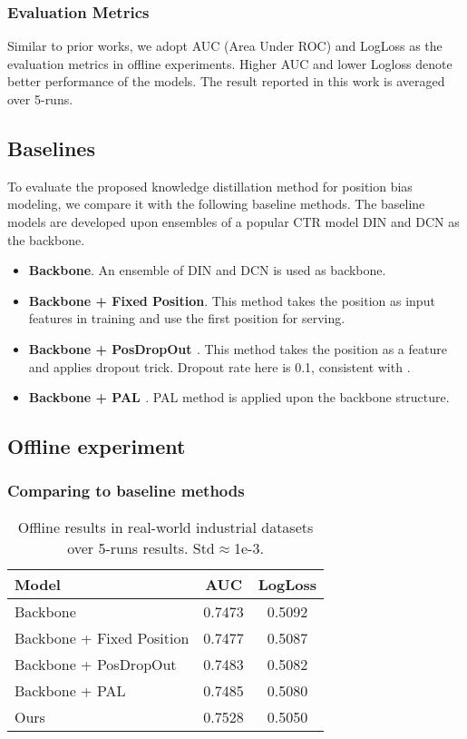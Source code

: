 \documentclass[sigconf,natbib=true,anonymous=false]{acmart}
\begin{document}
\subsubsection{Evaluation Metrics}
Similar to prior works, we adopt AUC (Area Under ROC) and LogLoss as the evaluation metrics in offline experiments.
Higher AUC and lower Logloss denote better performance of the models.
The result reported in this work is averaged over 5-runs.

\subsection{Baselines}
To evaluate the proposed knowledge distillation method for position bias modeling, we compare it with the following baseline methods.
The baseline models are developed upon ensembles of a popular CTR model DIN \cite{zhou2018deep} and DCN \cite{wang2017deep} as the backbone.

\begin{itemize}
    \item \textbf{Backbone}. An ensemble of DIN and DCN is used as backbone.
    \item \textbf{Backbone + Fixed Position}. This method takes the position as input features in training and use the first position for serving.
    \item \textbf{Backbone + PosDropOut \cite{zhao2019recommending}}. This method takes the position as a feature and applies dropout trick. Dropout rate here is 0.1, consistent with \cite{zhao2019recommending}.
    \item \textbf{Backbone + PAL \cite{guo2019pal}}.  PAL method is applied upon the backbone structure.
\end{itemize}

\subsection{Offline experiment}

\subsubsection{Comparing to baseline methods}

\begin{table}[]
\centering
\caption{ Offline results in real-world industrial datasets over 5-runs results. Std$\approx$1e-3. }
\label{tab:offline_benchmark}
\begin{tabular}{lcc}
\hline
Model                & AUC     & LogLoss  \\ \hline
Backbone                  &  0.7473    & 0.5092     \\
Backbone + Fixed Position & 0.7477   & 0.5087    \\
Backbone + PosDropOut     & 0.7483    & 0.5082     \\
Backbone + PAL            & 0.7485    & 0.5080     \\
Ours                 & 0.7528    & 0.5050     \\ \hline
\end{tabular}
\end{table}
\end{document}
